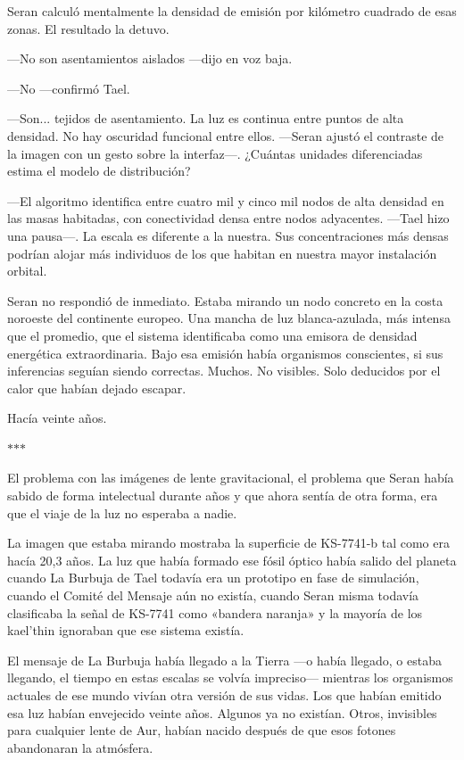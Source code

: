 \documentclass[11pt,a5paper,twoside]{book}
\begin{document}
Seran calculó mentalmente la densidad de emisión por kilómetro cuadrado de esas zonas. El resultado la detuvo.

—No son asentamientos aislados —dijo en voz baja.

—No —confirmó Tael.

—Son... tejidos de asentamiento. La luz es continua entre puntos de alta densidad. No hay oscuridad funcional entre ellos. —Seran ajustó el contraste de la imagen con un gesto sobre la interfaz—. ¿Cuántas unidades diferenciadas estima el modelo de distribución?

—El algoritmo identifica entre cuatro mil y cinco mil nodos de alta densidad en las masas habitadas, con conectividad densa entre nodos adyacentes. —Tael hizo una pausa—. La escala es diferente a la nuestra. Sus concentraciones más densas podrían alojar más individuos de los que habitan en nuestra mayor instalación orbital.

Seran no respondió de inmediato. Estaba mirando un nodo concreto en la costa noroeste del continente europeo. Una mancha de luz blanca-azulada, más intensa que el promedio, que el sistema identificaba como una emisora de densidad energética extraordinaria. Bajo esa emisión había organismos conscientes, si sus inferencias seguían siendo correctas. Muchos. No visibles. Solo deducidos por el calor que habían dejado escapar.

Hacía veinte años.

\vspace{1.5em}
\begin{center}$\ast$\quad$\ast$\quad$\ast$\end{center}
\vspace{1.5em}

El problema con las imágenes de lente gravitacional, el problema que Seran había sabido de forma intelectual durante años y que ahora sentía de otra forma, era que el viaje de la luz no esperaba a nadie.

La imagen que estaba mirando mostraba la superficie de KS-7741-b tal como era hacía 20,3 años. La luz que había formado ese fósil óptico había salido del planeta cuando La Burbuja de Tael todavía era un prototipo en fase de simulación, cuando el Comité del Mensaje aún no existía, cuando Seran misma todavía clasificaba la señal de KS-7741 como «bandera naranja» y la mayoría de los kael'thin ignoraban que ese sistema existía.

El mensaje de La Burbuja había llegado a la Tierra —o había llegado, o estaba llegando, el tiempo en estas escalas se volvía impreciso— mientras los organismos actuales de ese mundo vivían otra versión de sus vidas. Los que habían emitido esa luz habían envejecido veinte años. Algunos ya no existían. Otros, invisibles para cualquier lente de Aur, habían nacido después de que esos fotones abandonaran la atmósfera.
\end{document}
